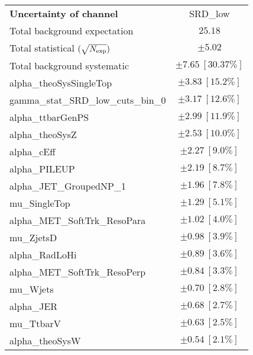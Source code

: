 
\begin{table}
\begin{center}
\setlength{\tabcolsep}{0.0pc}
\begin{tabular*}{\textwidth}{@{\extracolsep{\fill}}lc}
\noalign{\smallskip}\hline\noalign{\smallskip}
{\bf Uncertainty of channel}                                    & SRD\_low            \\
\noalign{\smallskip}\hline\noalign{\smallskip}
Total background expectation             &  $25.18$       \\
\noalign{\smallskip}\hline\noalign{\smallskip}
Total statistical $(\sqrt{N_{\rm exp}})$              & $\pm 5.02$       \\
Total background systematic               & $\pm 7.65\ [30.37\%] $             \\
\noalign{\smallskip}\hline\noalign{\smallskip}
\noalign{\smallskip}\hline\noalign{\smallskip}
alpha\_theoSysSingleTop         & $\pm 3.83\ [15.2\%] $       \\
gamma\_stat\_SRD\_low\_cuts\_bin\_0         & $\pm 3.17\ [12.6\%] $       \\
alpha\_ttbarGenPS         & $\pm 2.99\ [11.9\%] $       \\
alpha\_theoSysZ         & $\pm 2.53\ [10.0\%] $       \\
alpha\_cEff         & $\pm 2.27\ [9.0\%] $       \\
alpha\_PILEUP         & $\pm 2.19\ [8.7\%] $       \\
alpha\_JET\_GroupedNP\_1         & $\pm 1.96\ [7.8\%] $       \\
mu\_SingleTop         & $\pm 1.29\ [5.1\%] $       \\
alpha\_MET\_SoftTrk\_ResoPara         & $\pm 1.02\ [4.0\%] $       \\
mu\_ZjetsD         & $\pm 0.98\ [3.9\%] $       \\
alpha\_RadLoHi         & $\pm 0.89\ [3.6\%] $       \\
alpha\_MET\_SoftTrk\_ResoPerp         & $\pm 0.84\ [3.3\%] $       \\
mu\_Wjets         & $\pm 0.70\ [2.8\%] $       \\
alpha\_JER         & $\pm 0.68\ [2.7\%] $       \\
mu\_TtbarV         & $\pm 0.63\ [2.5\%] $       \\
alpha\_theoSysW         & $\pm 0.54\ [2.1\%] $       \\

\end{tabular*}
\end{center}
\end{table}

